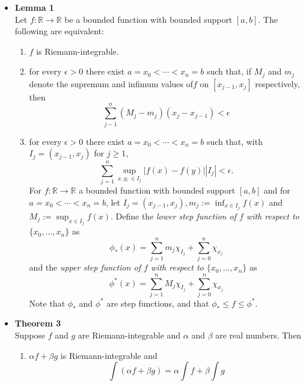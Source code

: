 \documentclass[11pt,a4paper]{article}
\begin{document}
\begin{itemize}
    \item \textbf{Lemma 1} \\
        Let $f : \mathbb{R} \to \mathbb{R}$ be a bounded function with bounded support
        $[a, b]$.
        The following are equivalent:
        \begin{enumerate}
            \item $f$ is Riemann-integrable.
            \item for every $\epsilon > 0$ there exist $a = x_0 < \cdots < x_n = b$ such that,
                if $M_j$ and $m_j$ denote the supremum and infimum values of$f$ on
                $[x_{j-1}, x_j]$ respectively, then
                \[
                    \sum_{j-1}^n (M_j - m_j) (x_j - x_{j-1}) < \epsilon
                \]
            \item for every $\epsilon > 0$ there exist $a = x_0 < \cdots < x_n = b$
                such that, with $I_j = (x_{j-1}, x_j)$ for $j \geq 1$,
                \[
                    \sum_{j=1}^n \sup_{x, y, \in I_j} |f(x) - f(y)| |I_j| < \epsilon.
                \]
                For $f : \mathbb{R} \to \mathbb{R}$ a bounded function with bounded support
                $[a, b]$ and for $a = x_0 < \cdots < x_n = b$,
                let $I_j = (x_{j-1}, x_j), m_j := \inf_{x \in I_j} f(x)$ and
                $M_j := \sup_{x \in I_j} f(x)$.
                Define the \emph{lower step function of $f$ with respect to
                $\{x_0, \ldots, x_n\}$} as
                \[
                    \phi_*(x) = \sum_{j=1}^n m_j \chi_{I_j} + \sum_{j=0}^n \chi_{x_j}
                \]
                and the \emph{upper step function of $f$ with respect to
                $\{x_0, \ldots, x_n\}$} as
                \[
                    \phi^*(x) = \sum_{j=1}^n M_j \chi_{I_j} + \sum_{j=0}^n \chi_{x_j}
                \]
                Note that $\phi_*$ and $\phi^*$ are step functions, and that
                $\phi_* \leq f \leq \phi^*$.

        \end{enumerate}

    \item \textbf{Theorem 3} \\
        Suppose $f$ and $g$ are Riemann-integrable and $\alpha$ and $\beta$ are real numbers.
        Then
        \begin{enumerate}
            \item $\alpha f + \beta g$ is Riemann-integrable and
                \[
                    \int(\alpha f + \beta g) = \alpha \int f + \beta \int g
                \]


\end{enumerate}
\end{itemize}
\end{document}
